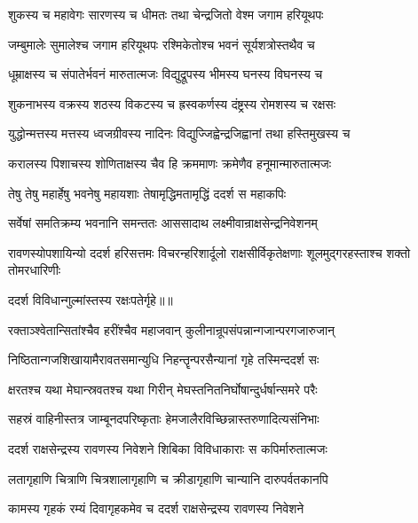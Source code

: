 \twolineshloka
{शुकस्य च महावेगः सारणस्य च धीमतः}
{तथा चेन्द्रजितो वेश्म जगाम हरियूथपः} %

\twolineshloka
{जम्बुमालेः सुमालेश्च जगाम हरियूथपः}
{रश्मिकेतोश्च भवनं सूर्यशत्रोस्तथैव च} %

\twolineshloka
{धूम्राक्षस्य च संपातेर्भवनं मारुतात्मजः}
{विद्युद्रूपस्य भीमस्य घनस्य विघनस्य च} %

\twolineshloka
{शुकनाभस्य वक्रस्य शठस्य विकटस्य च}
{ह्रस्वकर्णस्य दंष्ट्रस्य रोमशस्य च रक्षसः} %

\twolineshloka
{युद्धोन्मत्तस्य मत्तस्य ध्वजग्रीवस्य नादिनः}
{विद्युज्जिह्वेन्द्रजिह्वानां तथा हस्तिमुखस्य च} %

\twolineshloka
{करालस्य पिशाचस्य शोणिताक्षस्य चैव हि}
{क्रममाणः क्रमेणैव हनूमान्मारुतात्मजः} %

\twolineshloka
{तेषु तेषु महार्हेषु भवनेषु महायशाः}
{तेषामृद्धिमतामृद्धिं ददर्श स महाकपिः} %

\twolineshloka
{सर्वेषां समतिक्रम्य भवनानि समन्ततः}
{आससादाथ लक्ष्मीवान्राक्षसेन्द्रनिवेशनम्} %

\threelineshloka
{रावणस्योपशायिन्यो ददर्श हरिसत्तमः}
{विचरन्हरिशार्दूलो राक्षसीर्विकृतेक्षणाः}
{शूलमुद्गरहस्ताश्च शक्तो तोमरधारिणीः} %

{ददर्श विविधान्गुल्मांस्तस्य रक्षःपतेर्गृहे॥॥} %

\addtocounter{shlokacount}{1}

\twolineshloka
{रक्ताञ्श्वेतान्सितांश्चैव हरींश्चैव महाजवान्}
{कुलीनान्रूपसंपन्नान्गजान्परगजारुजान्} %

\twolineshloka
{निष्ठितान्गजशिखायामैरावतसमान्युधि}
{निहन्तॄन्परसैन्यानां गृहे तस्मिन्ददर्श सः} %

\twolineshloka
{क्षरतश्च यथा मेघान्स्रवतश्च यथा गिरीन्}
{मेघस्तनितनिर्घोषान्दुर्धर्षान्समरे परैः} %

\twolineshloka
{सहस्रं वाहिनीस्तत्र जाम्बूनदपरिष्कृताः}
{हेमजालैरविच्छिन्नास्तरुणादित्यसंनिभाः} %

\twolineshloka
{ददर्श राक्षसेन्द्रस्य रावणस्य निवेशने}
{शिबिका विविधाकाराः स कपिर्मारुतात्मजः} %

\twolineshloka
{लतागृहाणि चित्राणि चित्रशालागृहाणि च}
{क्रीडागृहाणि चान्यानि दारुपर्वतकानपि} %

\twolineshloka
{कामस्य गृहकं रम्यं दिवागृहकमेव च}
{ददर्श राक्षसेन्द्रस्य रावणस्य निवेशने} %

